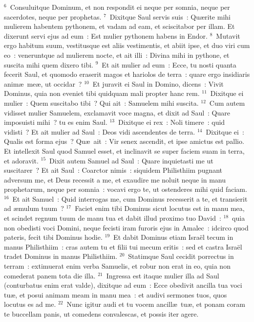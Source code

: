 ${}^{6}$~Consuluitque Dominum, et non respondit ei neque per somnia, neque per sacerdotes, neque per prophetas.
${}^{7}$~Dixitque Saul servis suis~: Qu\ae rite mihi mulierem habentem pythonem, et vadam ad eam, et sciscitabor per illam. Et dixerunt servi ejus ad eum~: Est mulier pythonem habens in Endor.
${}^{8}$~Mutavit ergo habitum suum, vestitusque est aliis vestimentis, et abiit ipse, et duo viri cum eo~: veneruntque ad mulierem nocte, et ait illi~: Divina mihi in pythone, et suscita mihi quem dixero tibi.
${}^{9}$~Et ait mulier ad eum~: Ecce, tu nosti quanta fecerit Saul, et quomodo eraserit magos et hariolos de terra~: quare ergo insidiaris anim\ae\ me\ae , ut occidar~?
${}^{10}$~Et juravit ei Saul in Domino, dicens~: Vivit Dominus, quia non eveniet tibi quidquam mali propter hanc rem.
${}^{11}$~Dixitque ei mulier~: Quem suscitabo tibi~? Qui ait~: Samuelem mihi suscita.
${}^{12}$~Cum autem vidisset mulier Samuelem, exclamavit voce magna, et dixit ad Saul~: Quare imposuisti mihi~? tu es enim Saul.
${}^{13}$~Dixitque ei rex~: Noli timere~: quid vidisti~? Et ait mulier ad Saul~: Deos vidi ascendentes de terra.
${}^{14}$~Dixitque ei~: Qualis est forma ejus~? Qu\ae\ ait~: Vir senex ascendit, et ipse amictus est pallio. Et intellexit Saul quod Samuel esset, et inclinavit se super faciem suam in terra, et adoravit.
${}^{15}$~Dixit autem Samuel ad Saul~: Quare inquietasti me ut suscitarer~? Et ait Saul~: Coarctor nimis~: siquidem Philisthiim pugnant adversum me, et Deus recessit a me, et exaudire me noluit neque in manu prophetarum, neque per somnia~: vocavi ergo te, ut ostenderes mihi quid faciam.
${}^{16}$~Et ait Samuel~: Quid interrogas me, cum Dominus recesserit a te, et transierit ad \ae mulum tuum~?
${}^{17}$~Faciet enim tibi Dominus sicut locutus est in manu mea, et scindet regnum tuum de manu tua et dabit illud proximo tuo David~:
${}^{18}$~quia non obedisti voci Domini, neque fecisti iram furoris ejus in Amalec~: idcirco quod pateris, fecit tibi Dominus hodie.
${}^{19}$~Et dabit Dominus etiam Isra\"el tecum in manus Philisthiim~: cras autem tu et filii tui mecum eritis~: sed et castra Isra\"el tradet Dominus in manus Philisthiim.
${}^{20}$~Statimque Saul cecidit porrectus in terram~: extimuerat enim verba Samuelis, et robur non erat in eo, quia non comederat panem tota die illa.
${}^{21}$~Ingressa est itaque mulier illa ad Saul (conturbatus enim erat valde), dixitque ad eum~: Ecce obedivit ancilla tua voci tu\ae , et posui animam meam in manu mea~: et audivi sermones tuos, quos locutus es ad me.
${}^{22}$~Nunc igitur audi et tu vocem ancill\ae\ tu\ae , et ponam coram te buccellam panis, ut comedens convalescas, et possis iter agere.
